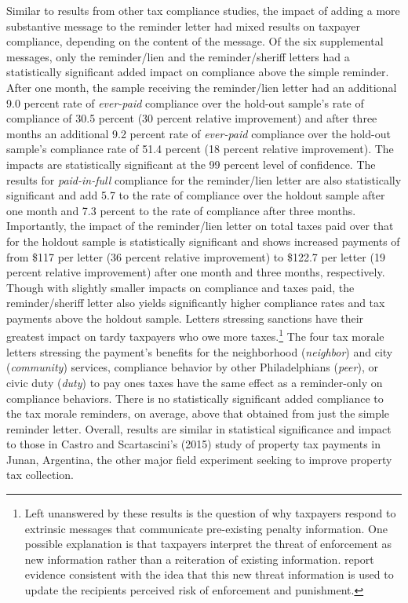 \documentclass[12pt]{article}
\begin{document}
Similar to results from other tax compliance studies, the impact of
adding a more substantive message to the reminder letter had mixed
results on taxpayer compliance, depending on the content of the
message.  Of the six supplemental messages, only the reminder/lien and
the reminder/sheriff letters had a statistically significant added
impact on compliance above the simple reminder.  After one month, the
sample receiving the reminder/lien letter had an additional 9.0
percent rate of \textit{ever-paid} compliance over the hold-out
sample's rate of compliance of 30.5 percent (30 percent relative
improvement) and after three months an additional 9.2 percent rate of
\textit{ever-paid} compliance over the hold-out sample's compliance
rate of 51.4 percent (18 percent relative improvement).  The impacts
are statistically significant at the 99 percent level of confidence.
The results for \textit{paid-in-full} compliance for the reminder/lien
letter are also statistically significant and add 5.7 to the rate of
compliance over the holdout sample after one month and 7.3 percent to
the rate of compliance after three months.  Importantly, the impact of
the reminder/lien letter on total taxes paid over that for the holdout
sample is statistically significant and shows increased payments of
from \$117 per letter (36 percent relative improvement) to \$122.7 per
letter (19 percent relative improvement) after one month and three months,
respectively. Though with slightly smaller impacts on compliance and
taxes paid, the reminder/sheriff letter also yields significantly
higher compliance rates and tax payments above the holdout
sample. Letters stressing sanctions have their greatest impact on
tardy taxpayers who owe more taxes.\footnote{ Left unanswered by these
  results is the question of why taxpayers respond to extrinsic
  messages that communicate pre-existing penalty information.  One
  possible explanation is that taxpayers interpret the threat of
  enforcement as new information rather than a reiteration of existing
  information.  report evidence consistent with
  the idea that this new threat information is used to update the
  recipients perceived risk of enforcement and punishment.}  The
four tax morale letters stressing the payment's benefits for the
neighborhood (\textit{neighbor}) and city (\textit{community})
services, compliance behavior by other Philadelphians (\textit{peer}),
or civic duty (\textit{duty}) to pay ones taxes have the same effect
as a reminder-only on compliance behaviors.  There is no statistically
significant added compliance to the tax morale reminders, on average,
above that obtained from just the simple reminder letter.  Overall,
results are similar in statistical significance and impact to those in
Castro and Scartascini's (2015) study of property tax payments in
Junan, Argentina, the other major field experiment seeking to improve
property tax collection.
\end{document}
